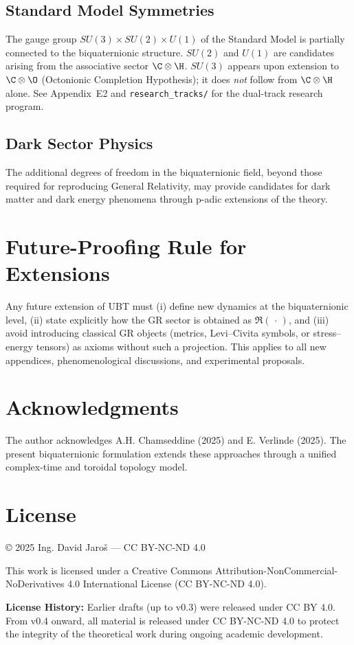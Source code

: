 \documentclass[12pt]{article}
\begin{document}
\subsection{Standard Model Symmetries}

The gauge group $SU(3) \times SU(2) \times U(1)$ of the Standard Model is partially connected to the biquaternionic structure. $SU(2)$ and $U(1)$ are candidates arising from the associative sector $\C \otimes \H$. $SU(3)$ appears upon extension to $\C \otimes \O$ (Octonionic Completion Hypothesis); it does \emph{not} follow from $\C \otimes \H$ alone. See Appendix~E2 and \texttt{research\_tracks/} for the dual-track research program.

\subsection{Dark Sector Physics}

The additional degrees of freedom in the biquaternionic field, beyond those required for reproducing General Relativity, may provide candidates for dark matter and dark energy phenomena through p-adic extensions of the theory.

\section{Future-Proofing Rule for Extensions}

Any future extension of UBT must (i) define new dynamics at the biquaternionic level, (ii) state explicitly how the GR sector is obtained as $\Re(\,\cdot\,)$, and (iii) avoid introducing classical GR objects (metrics, Levi--Civita symbols, or stress--energy tensors) as axioms without such a projection. This applies to all new appendices, phenomenological discussions, and experimental proposals.

\section{Acknowledgments}

The author acknowledges A.H. Chamseddine (2025) and E. Verlinde (2025).  
The present biquaternionic formulation extends these approaches through a unified complex-time and toroidal topology model.

\appendix









\section*{License}
© 2025 Ing. David Jaroš — CC BY-NC-ND 4.0

This work is licensed under a Creative Commons Attribution-NonCommercial-NoDerivatives 4.0 International License (CC BY-NC-ND 4.0).

\textbf{License History:} Earlier drafts (up to v0.3) were released under CC BY 4.0. From v0.4 onward, all material is released under CC BY-NC-ND 4.0 to protect the integrity of the theoretical work during ongoing academic development.
\end{document}
